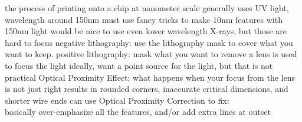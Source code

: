 \documentclass[12pt]{article}
\begin{document}
\begin{spacing}{0.8}
\begin{multicols*}{2}
\begin{flushleft}
\begin{outline}[longenum]
  \1 the process of printing onto a chip at nanometer scale
  \1 generally uses UV light, wavelength around 150nm
    \2 must use fancy tricks to make 10nm features with 150nm light
    \2 would be nice to use even lower wavelength X-rays, but those are hard to focus
  \1 negative lithography: use the lithography mask to cover what you want to keep.
  \1 positive lithography: mask what you want to remove
  \1 a lens is used to focus the light
    \2 ideally, want a point source for the light, but that is not practical
    \2 Optical Proximity Effect: what happens when your focus from the lens is not just right
    \2 results in rounded corners, inaccurate critical dimensions, and shorter wire ends
    \2 can use Optical Proximity Correction to fix:
    \\ basically over-emphasize all the features, and/or add extra lines at outset


\end{outline}
\end{flushleft}
\end{multicols*}
\end{spacing}
\end{document}
